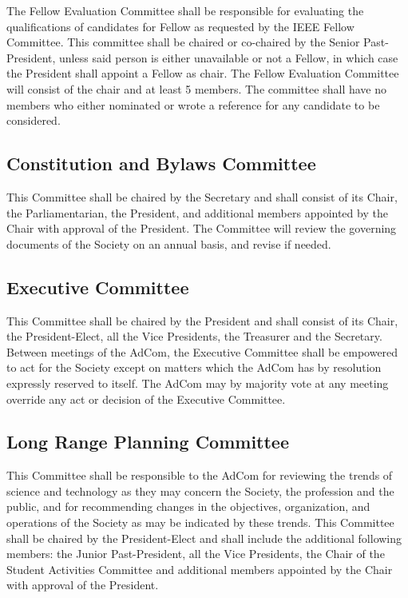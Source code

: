 \documentclass[10pt]{article}
\begin{document}
The Fellow Evaluation Committee shall be responsible for evaluating the qualifications of candidates for Fellow as requested by the IEEE Fellow Committee.  This committee shall be chaired or co-chaired by the Senior Past-President, unless said person is either unavailable or not a Fellow, in which case the President shall appoint a Fellow as chair. The Fellow Evaluation Committee will consist of the chair and at least 5 members. The committee shall have no members who either nominated or wrote a reference for any candidate to be considered.


\subsection{Constitution and Bylaws Committee}

This Committee shall be chaired by the Secretary and shall consist of its Chair, the Parliamentarian, the President, and additional members appointed by the Chair with approval of the President. The Committee will review the governing documents of the Society on an annual basis, and revise if needed.

\subsection{Executive Committee}

This Committee shall be chaired by the President and shall consist of its Chair, the President-Elect, all the Vice Presidents, the Treasurer and the Secretary. Between meetings of the AdCom, the Executive Committee shall be empowered to act for the Society except on matters which the AdCom has by resolution expressly reserved to itself.  The AdCom may by majority vote at any meeting override any act or decision of the Executive Committee. 

\subsection{Long Range Planning Committee}

This Committee shall be responsible to the AdCom for reviewing the trends of science and technology as they may concern the Society, the profession and the public, and for recommending changes in the objectives, organization, and operations of the Society as may be indicated by these trends. This Committee shall be chaired by the President-Elect and shall include the additional following members: the Junior Past-President, all the Vice Presidents, the Chair of the Student Activities Committee and additional members appointed by the Chair with approval of the President.
\end{document}
